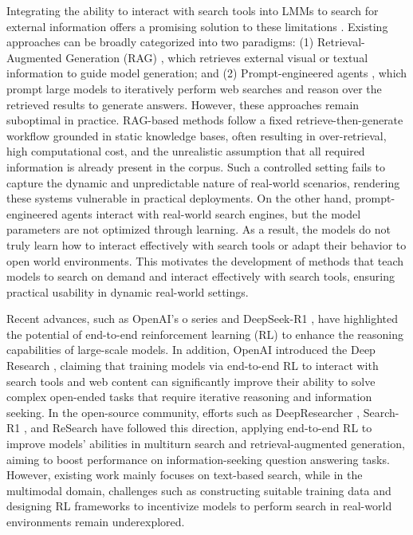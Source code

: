 \documentclass{article}
\begin{document}
Integrating the ability to interact with search tools into LMMs to search for external information offers a promising solution to these limitations \cite{vision-rag/mmsearch,vision-rag/avis,vision-rag/vsa}. Existing approaches can be broadly categorized into two paradigms: (1) Retrieval-Augmented Generation (RAG) \cite{vision-rag/murag,vision-rag/visrag,vision-rag/rag-vl}, which retrieves external visual or textual information to guide model generation; and (2) Prompt-engineered agents \cite{vision-rag/avis,vision-rag/vsa,vision-rag/mmsearch}, which prompt large models to iteratively perform web searches and reason over the retrieved results to generate answers. However, these approaches remain suboptimal in practice. RAG-based methods follow a fixed retrieve-then-generate workflow grounded in static knowledge bases, often resulting in over-retrieval, high computational cost, and the unrealistic assumption that all required information is already present in the corpus. Such a controlled setting fails to capture the dynamic and unpredictable nature of real-world scenarios, rendering these systems vulnerable in practical deployments. On the other hand, prompt-engineered agents interact with real-world search engines, but the model parameters are not optimized through learning. As a result, the models do not truly learn how to interact effectively with search tools or adapt their behavior to open world environments. This motivates the development of methods that teach models to search on demand and interact effectively with search tools, ensuring practical usability in dynamic real-world settings.

Recent advances, such as OpenAI's o series \cite{rl/openai-o1,openai-o3_o4_mini_syscard} and DeepSeek-R1 \cite{rl/deepseek-r1}, have highlighted the potential of end-to-end reinforcement learning (RL) to enhance the reasoning capabilities of large-scale models. In addition, OpenAI introduced the Deep Research \cite{openai-deep-research}, claiming that training models via end-to-end RL to interact with search tools and web content can significantly improve their ability to solve complex open-ended tasks that require iterative reasoning and information seeking. In the open-source community, efforts such as DeepResearcher \cite{text-search/deepresearcher}, Search-R1 \cite{text-search/search-r1}, and ReSearch \cite{text-search/ReSearch} have followed this direction, applying end-to-end RL to improve models’ abilities in multiturn search and retrieval-augmented generation, aiming to boost performance on information-seeking question answering tasks. However, existing work mainly focuses on text-based search, while in the multimodal domain, challenges such as constructing suitable training data and designing RL frameworks to incentivize models to perform search in real-world environments remain underexplored.
\end{document}
